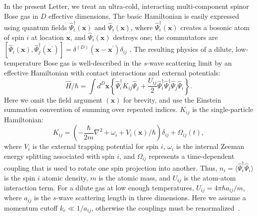 \documentclass[aps,prl,twocolumn,showpacs,amsmath,amssymb,superscriptaddress,flushbottom,noraggedfooter]{revtex4-1}
\newcommand{\xvec}{\boldsymbol{x}}
\begin{document}
In the present Letter, we treat an ultra-cold,
interacting multi-component spinor Bose gas in $D$ effective dimensions.
The basic Hamiltonian is easily expressed using quantum fields
$\widehat{\Psi}_{i}^{\dagger}(\xvec)$ and $\widehat{\Psi}_{i}(\xvec)$,
where $\widehat{\Psi}_{i}^{\dagger}(\xvec)$ creates a bosonic atom of spin $i$
at location $\xvec$, and $\widehat{\Psi}_{i}(\xvec)$ destroys one;
the commutators are
$[\widehat{\Psi}_{i}(\xvec),\widehat{\Psi}_{j}^{\dagger}(\xvec^\prime)] =
\delta^{(D)}(\xvec-\xvec^\prime)\delta_{ij}\,\,.$
The resulting physics of a dilute, low-temperature Bose gas
is well-described in the $s$-wave scattering limit by an effective Hamiltonian
with contact interactions and external potentials:
\begin{equation}
	\hat{H} / \hbar = \int d^{D}\xvec \left\{
		\widehat{\Psi}_{i}^{\dagger} K_{ij} \widehat{\Psi}_{j} +
		\frac{U_{ij}}{2} \widehat{\Psi}_{i}^{\dagger} \widehat{\Psi}_{j}^{\dagger}
		\widehat{\Psi}_{j} \widehat{\Psi}_{i}
	\right\}.
\end{equation}
Here we omit the field argument $(\xvec)$ for brevity,
and use the Einstein summation convention of summing over repeated indices.
$K_{ij}$ is the single-particle Hamiltonian:
\begin{equation}
	K_{ij} = \left( -\frac{\hbar}{2m} \nabla^2 + \omega_i + V_i(\xvec) / \hbar \right) \delta_{ij} +
		\Omega_{ij}(t),
\end{equation}
where $V_{i}$ is the external trapping potential for spin $i$,
$\omega_{i}$ is the internal Zeeman energy splitting associated with spin $i$,
and $\Omega_{ij}$ represents a time-dependent coupling
that is used to rotate one spin projection into another.
Thus, $n_i = \langle \widehat{\Psi}_{i}^{\dagger} \widehat{\Psi}_{i} \rangle$
is the spin $i$ atomic density, $m$ is the atomic mass,
and $U_{ij}$ is the atom-atom interaction term.
For a dilute gas at low enough temperatures,
$U_{ij}=4\pi\hbar a_{ij} / m$, where $a_{ij}$ is the $s$-wave scattering length in three dimensions.
Here we assume a momentum cutoff $k_{c} \ll 1 / a_{ij}$,
otherwise the couplings must be renormalized~\cite{Sinatra2002}.
\end{document}

